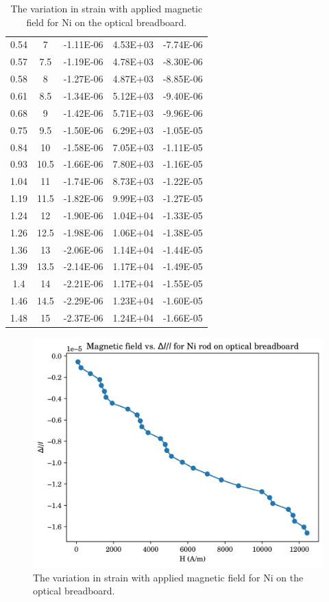 \begin{table}[]
{\begin{tabular}{@{}ccccc@{}}
			0.54 & 7    & -1.11E-06 & 4.53E+03 & -7.74E-06 \\
			0.57 & 7.5  & -1.19E-06 & 4.78E+03 & -8.30E-06 \\
			0.58 & 8    & -1.27E-06 & 4.87E+03 & -8.85E-06 \\
			0.61 & 8.5  & -1.34E-06 & 5.12E+03 & -9.40E-06 \\
			0.68 & 9    & -1.42E-06 & 5.71E+03 & -9.96E-06 \\
			0.75 & 9.5  & -1.50E-06 & 6.29E+03 & -1.05E-05 \\
			0.84 & 10   & -1.58E-06 & 7.05E+03 & -1.11E-05 \\
			0.93 & 10.5 & -1.66E-06 & 7.80E+03 & -1.16E-05 \\
			1.04 & 11   & -1.74E-06 & 8.73E+03 & -1.22E-05 \\
			1.19 & 11.5 & -1.82E-06 & 9.99E+03 & -1.27E-05 \\
			1.24 & 12   & -1.90E-06 & 1.04E+04 & -1.33E-05 \\
			1.26 & 12.5 & -1.98E-06 & 1.06E+04 & -1.38E-05 \\
			1.36 & 13   & -2.06E-06 & 1.14E+04 & -1.44E-05 \\
			1.39 & 13.5 & -2.14E-06 & 1.17E+04 & -1.49E-05 \\
			1.4  & 14   & -2.21E-06 & 1.17E+04 & -1.55E-05 \\
			1.46 & 14.5 & -2.29E-06 & 1.23E+04 & -1.60E-05 \\
			1.48 & 15   & -2.37E-06 & 1.24E+04 & -1.66E-05 \\ \bottomrule
		\end{tabular}%
	}
	\caption{The variation in strain with applied magnetic field for Ni on the optical breadboard.}
	\label{tab:ob-Ni}
\end{table}
\begin{figure}
	\centering
	\includegraphics{data/ob-Ni-1}
	\caption{The variation in strain with applied magnetic field for Ni on the optical breadboard.}
	\label{fig:ob-ni-1}
\end{figure}

\setcounter{equation}{0}
\setcounter{table}{0}
\setcounter{figure}{0}